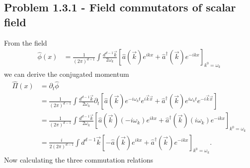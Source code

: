 \documentclass[10pt,a4paper]{book}
\theoremstyle{definition}
\begin{document}
\subsection{Problem 1.3.1 - Field commutators of scalar field}
From the field  
\begin{align}
    \hat\phi(x)&=\frac{1}{(2\pi)^{d-1}}\int \frac{d^{d-1}\vec{k}}{2\omega_k}\left[\hat a(\vec{k})e^{ikx} + \hat a^\dagger(\vec{k})e^{-ikx}\right]_{k^0=\omega_k}
\end{align}
we can derive the conjugated momentum
\begin{align}
    \hat\Pi(x)&=\partial_t\hat\phi\\
    &=\frac{1}{(2\pi)^{d-1}}\int \frac{d^{d-1}\vec{k}}{2\omega_k}\partial_t\left[\hat a(\vec{k})e^{-i\omega_kt}e^{i\vec{k}\vec{x}} + \hat a^\dagger(\vec{k})e^{i\omega_kt}e^{-i\vec{k}\vec{x}}\right]\\
    &=\frac{1}{(2\pi)^{d-1}}\int \frac{d^{d-1}\vec{k}}{2\omega_k}\left[\hat a(\vec{k})(-i\omega_k)e^{ikx} + \hat a^\dagger(\vec{k})(i\omega_k)e^{-ikx}\right]_{k^0=\omega_k}\\
    &=\frac{i}{2(2\pi)^{d-1}}\int d^{d-1}\vec{k}\left[-\hat a(\vec{k})e^{ikx} + \hat a^\dagger(\vec{k})e^{-ikx}\right]_{k^0=\omega_k}.
\end{align}
Now calculating the three commutation relations
\end{document}
